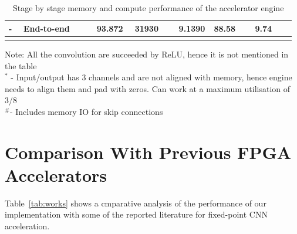 \documentclass[a4paper,12pt, final]{report}
\begin{document}
\begin{table}
{\begin{tabular}{P{0.05\linewidth} P{0.25\linewidth} P{0.13\linewidth} P{0.15\linewidth} P{0.12\linewidth} P{0.14\linewidth} P{0.14\linewidth} }
		\bottomrule
		- & End-to-end & 93.872 & 31930 & 9.1390 & 88.58 & 9.74\\
		\bottomrule
		\\
	\end{tabular}
	}
	Note: All the convolution are succeeded by ReLU, hence it is not mentioned in the table\\
	$^*$ - Input/output has 3 channels and are not aligned with memory, hence engine needs to align them and pad with zeros. Can work at a maximum utilisation of 3/8\\
	 $^\#$- Includes memory IO for skip connections\\
	 \caption{Stage by stage memory and compute performance of the accelerator engine}
	 \label{tab:stage}
\end{table}

\section{Comparison With Previous FPGA Accelerators}

Table~\ref{tab:works} shows a cmparative analysis of the performance of our implementation with some of the reported literature for fixed-point CNN acceleration.
\end{document}
